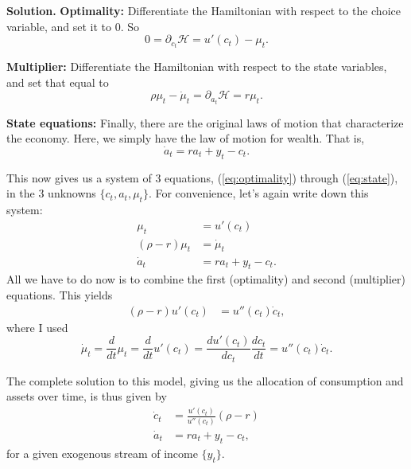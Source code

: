 \documentclass[11pt]{extarticle}
\theoremstyle{plain}
\theoremstyle{definition}
\begin{document}
\vspace{5mm}
\noindent
\textbf{Solution.} 
\textbf{Optimality:} Differentiate the Hamiltonian with respect to the choice variable, and set it to $0$. So
\begin{equation}\label{eq:optimality}
	0 = \partial_{c_t} \mathcal{H} = u'(c_t) - \mu_t. 
\end{equation}

\vspace{3mm}
\noindent
\textbf{Multiplier:} Differentiate the Hamiltonian with respect to the state variables, and set that equal to 
\begin{equation}\label{eq:multiplier}
	\rho \mu_t - \dot{\mu}_t  = \partial_{a_t} \mathcal{H} = r  \mu_t.
\end{equation}

\vspace{3mm}
\noindent
\textbf{State equations:} Finally, there are the original laws of motion that characterize the economy. Here, we simply have the law of motion for wealth. That is, 
\begin{equation}\label{eq:state}
	\dot{a}_t = r a_t + y_t - c_t.
\end{equation}

\vspace{6mm}
\noindent
This now gives us a system of 3 equations, (\ref{eq:optimality}) through (\ref{eq:state}), in the 3 unknowns $\{c_t, a_t, \mu_t\}$. For convenience, let's again write down this system: 
\begin{align*}
	\mu_t &= u'(c_t) \\
	(\rho - r) \mu_t &= \dot{\mu}_t \\
	\dot{a}_t &= r a_t + y_t - c_t.
\end{align*}
All we have to do now is to combine the first (optimality) and second (multiplier) equations. This yields 
\begin{align*}
	(\rho - r) u'(c_t) &= u''(c_t) \dot{c}_t,
\end{align*}
where I used 
\begin{equation*}
	\dot{\mu}_t = \frac{d}{dt} \mu_t = \frac{d}{dt} u'(c_t) = \frac{d u'(c_t)}{d c_t} \frac{d c_t}{dt} = u''(c_t) \dot{c}_t. 
\end{equation*}


The complete solution to this model, giving us the allocation of consumption and assets over time, is thus given by
\begin{align*}
	\dot{c}_t  &= \frac{u'(c_t)}{u''(c_t)} (\rho - r) \\
	\dot{a}_t &= r a_t + y_t - c_t,
\end{align*}
for a given exogenous stream of income $\{y_t\}$. 
\end{document}
